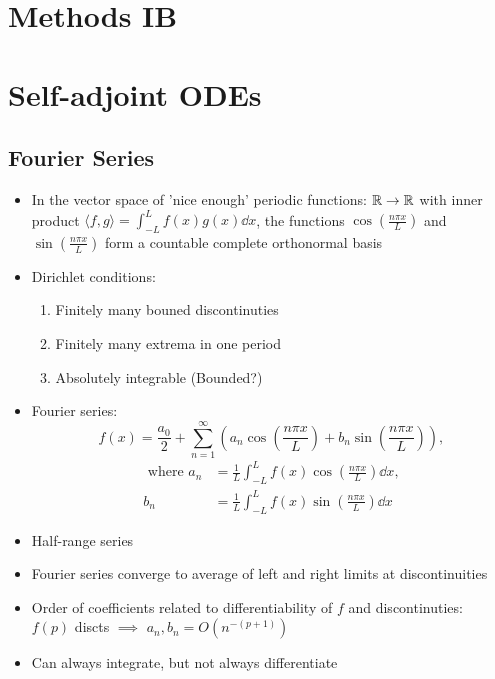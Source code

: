 


\section*{Methods \hfill IB}
\section{Self-adjoint ODEs}
\subsection*{Fourier Series}
\begin{itemize}
    \item In the vector space of 'nice enough' periodic functions: $\mathbb{R} \to \mathbb{R}$ with inner product $\langle f,g \rangle = \int_{-L}^{L} f(x) g(x) \dd{x} $, the functions $\cos\left(\frac{n\pi x}{L}\right)$ and $\sin\left(\frac{n\pi x}{L}\right)$ form a countable complete orthonormal basis
    \item Dirichlet conditions:
          \begin{enumerate}
              \item Finitely many bouned discontinuties
              \item Finitely many extrema in one period
              \item Absolutely integrable (Bounded?)
          \end{enumerate}
    \item Fourier series: \[f(x) = \frac{a_0}{2} + \sum_{n=1}^\infty \left( a_n \cos\left(\frac{n\pi x}{L} \right) + b_n \sin\left(\frac{n\pi x}{L}\right) \right),\]
          \begin{align*}
              \text{ where } a_n & = \frac{1}{L} \int_{-L}^L f(x) \cos\left(\frac{n\pi x}{L}\right) \dd{x}, \\
              b_n                & = \frac{1}{L} \int_{-L}^L f(x) \sin\left(\frac{n\pi x}{L}\right) \dd{x}
          \end{align*}
    \item Half-range series
    \item Fourier series converge to average of left and right limits at discontinuities
    \item Order of coefficients related to differentiability of $f$ and discontinuties: \\
          $f(p)$ discts $\implies$ $a_n,b_n = O(n^{-(p+1)})$
    \item Can always integrate, but not always differentiate
\end{itemize}

